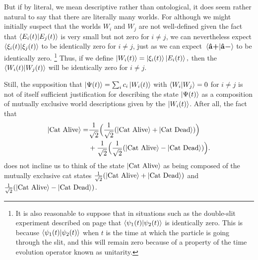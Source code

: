 \documentclass[letter, 12pt]{turabian-thesis}
\theoremstyle{hypothesis}
\newcommand{\uvb}[1]{\vb{\hat{{#1}}}}
\newcommand{\uvbp}[1]{\uvb{#1}\bm{+}}
\newcommand{\uvbm}[1]{\uvb{#1}\bm{-}}
\let\origfootnote\footnote %
\renewcommand{\footnote}[1]{%
\noindent %
\origfootnote{#1}}
\begin{document}
But if by literal, we mean descriptive rather than ontological, it does seem rather natural to say that there are literally many worlds. For although we might initially suspect that the worlds $W_i$ and $W_j$ are not well-defined given the fact that $\ip{E_i(t)}{E_j(t)}$ is very small but not zero for $i\neq j$, we can nevertheless expect $\ip{\xi_i(t)}{\xi_j(t)}$ to be identically zero for $i\neq j$, just as we can expect $\ip*{\uvbp{a}}{\uvbm{a}}$ to be identically zero.\footnote{It is also reasonable to suppose that in situations such as the double-slit experiment described on page \pageref{psi_slit} that $\ip{\psi_1(t)}{\psi_2(t)}$ is identically zero. This is because $\ip{\psi_1(t)}{\psi_2(t)}$ when $t$ is the time at which the particle is going through the slit, and this will remain zero because of a property of the time evolution operator known as unitarity.} Thus, if we define $\ket{W_i(t)}=\ket{\xi_i(t)}\ket{E_i(t)},$ then the $\ip{W_i(t)}{W_j(t)}$ will be identically zero for $i\neq j$. 

Still, the supposition that $\ket{\Psi(t)}= \sum_i c_i\ket{W_i(t)}$  with $\ip{W_i}{W_j}=0$ for $i\neq j$ is not of itself sufficient justification for describing the state $\ket{\Psi(t)}$ as a composition of mutually exclusive world descriptions given by the $\ket{W_i(t)}$. After all, the fact that
\begin{align*}\ket{\text{Cat Alive}}= &\frac{1}{\sqrt{2}}\Big(\frac{1}{\sqrt{2}}(\ket{\text{Cat Alive}}+\ket{\text{Cat Dead}})\Big)\\&+\frac{1}{\sqrt{2}}\Big( \frac{1}{\sqrt{2}}(\ket{\text{Cat Alive}}-\ket{\text{Cat Dead}})\Big). \end{align*} does not incline us to think of the state $\ket{\text{Cat Alive}}$ as being composed of the mutually exclusive cat states  $\frac{1}{\sqrt{2}}(\ket{\text{Cat Alive}}+\ket{\text{Cat Dead}})$ and $\frac{1}{\sqrt{2}}(\ket{\text{Cat Alive}}-\ket{\text{Cat Dead}})$. 
\end{document}
